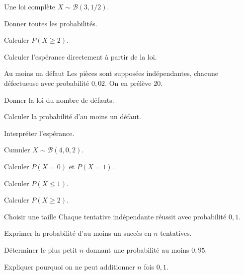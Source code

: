 \begingroup\renewcommand{\otBesoinPlace}[1]{}\begin{minipage}{\linewidth}
\begin{exercice}[2]{Une loi complète}
$X\sim\mathcal B(3,1/2)$.
\begin{questions}
\item Donner toutes les probabilités.
\item Calculer $P(X\geq2)$.
\item Calculer l’espérance directement à partir de la loi.
\end{questions}
\end{exercice}
\begin{exercice}[2]{Au moins un défaut}
Les pièces sont supposées indépendantes, chacune défectueuse avec probabilité $0{,}02$. On en prélève $20$.
\begin{questions}
\item Donner la loi du nombre de défauts.
\item Calculer la probabilité d’au moins un défaut.
\item Interpréter l’espérance.
\end{questions}
\end{exercice}
\begin{exercice}[2]{Cumuler}
$X\sim\mathcal B(4,0{,}2)$.
\begin{questions}
\item Calculer $P(X=0)$ et $P(X=1)$.
\item Calculer $P(X\leq1)$.
\item Calculer $P(X\geq2)$.
\end{questions}
\end{exercice}
\begin{exercice}[2]{Choisir une taille}
Chaque tentative indépendante réussit avec probabilité $0{,}1$.
\begin{questions}
\item Exprimer la probabilité d’au moins un succès en $n$ tentatives.
\item Déterminer le plus petit $n$ donnant une probabilité au moins $0{,}95$.
\item Expliquer pourquoi on ne peut additionner $n$ fois $0{,}1$.
\end{questions}
\end{exercice}
\end{minipage}\endgroup
\clearpage
{}
